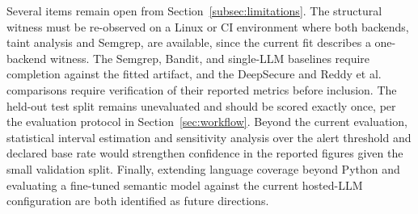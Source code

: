 \documentclass[conference]{IEEEtran}
\begin{document}
Several items remain open from Section~\ref{subsec:limitations}. The
structural witness must be re-observed on a Linux or CI environment where
both backends, taint analysis and Semgrep, are available, since the
current fit describes a one-backend witness. The Semgrep, Bandit, and
single-LLM baselines require completion against the fitted artifact, and
the DeepSecure and Reddy et al. comparisons require verification of their
reported metrics before inclusion. The held-out test split remains
unevaluated and should be scored exactly once, per the evaluation protocol
in Section~\ref{sec:workflow}. Beyond the current evaluation, statistical
interval estimation and sensitivity analysis over the alert threshold and
declared base rate would strengthen confidence in the reported figures
given the small validation split. Finally, extending language coverage
beyond Python and evaluating a fine-tuned semantic model against the
current hosted-LLM configuration are both identified as future directions.



\end{document}
